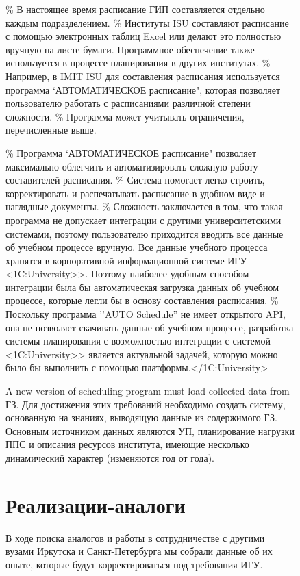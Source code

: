 \documentclass[ 

]{aiitart}
\begin{document}
\begin{figure}
\% В настоящее время расписание ГИП составляется отдельно каждым подразделением. \% Институты ISU составляют расписание с помощью электронных таблиц Excel или делают это полностью вручную на листе бумаги. Программное обеспечение также используется в процессе планирования в других институтах. \% Например, в IMIT ISU для составления расписания используется программа `АВТОМАТИЧЕСКОЕ расписание", которая позволяет пользователю работать с расписаниями различной степени сложности. \% Программа может учитывать ограничения, перечисленные выше. 

\% Программа `АВТОМАТИЧЕСКОЕ расписание" позволяет максимально облегчить и автоматизировать сложную работу составителей расписания. \% Система помогает легко строить, корректировать и распечатывать расписание в удобном виде и наглядные документы. \% Сложность заключается в том, что такая программа не допускает интеграции с другими университетскими системами, поэтому пользователю приходится вводить все данные об учебном процессе вручную. Все данные учебного процесса хранятся в корпоративной информационной системе ИГУ <1C:University>>. Поэтому наиболее удобным способом интеграции была бы автоматическая загрузка данных об учебном процессе, которые легли бы в основу составления расписания. \% Поскольку программа ''AUTO Schedule'' не имеет открытого API, она не позволяет скачивать данные об учебном процессе, разработка системы планирования с возможностью интеграции с системой <1C:University>> является актуальной задачей, которую можно было бы выполнить с помощью платформы.</1C:University> 

A new version of scheduling program must load collected data from ГЗ. Для достижения этих требований необходимо создать систему, основанную на знаниях, выводящую данные из содержимого ГЗ. Основным источником данных являются УП, планирование нагрузки ППС и описания ресурсов института, имеющие несколько динамический характер (изменяются год от года). 

\section{Реализации-аналоги} 

В ходе поиска аналогов и работы в сотрудничестве с другими вузами Иркутска и Санкт-Петербурга мы собрали данные об их опыте, которые будут корректироваться под требования ИГУ. 


\end{figure}
\end{document}
